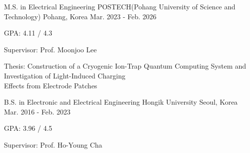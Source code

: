 

\begin{cventries}

  \cventry  
    {M.S. in Electrical Engineering} %
    {POSTECH(Pohang University of Science and Technology)} %
    {Pohang, Korea} %
    {Mar. 2023 - Feb. 2026} %
    {
      \begin{cvitems} %
        \item {GPA: 4.11 / 4.3}
        \item {Supervisor: Prof. Moonjoo Lee}
        \item {Thesis: Construction of a Cryogenic Ion-Trap Quantum Computing System and Investigation of Light-Induced Charging \\
              \hspace*{0.9 cm} Effects from Electrode Patches}
        \\
      \end{cvitems}
    }
    
  \cventry
    {B.S. in Electronic and Electrical Engineering} %
    {Hongik University} %
    {Seoul, Korea} %
    {Mar. 2016 - Feb. 2023} %
    {
      \begin{cvitems} %
        \item {GPA: 3.96 / 4.5}
        \item {Supervisor: Prof. Ho-Young Cha}
      \end{cvitems}
    }
\end{cventries}
